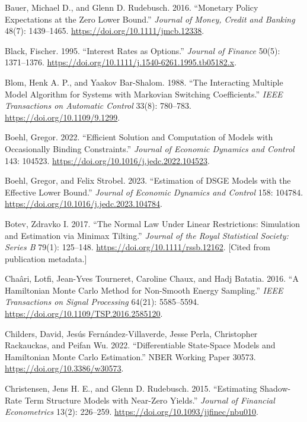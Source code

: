 \documentclass[11pt]{article}
\begin{document}
\begin{list}{}{\setlength{\leftmargin}{2em}\setlength{\itemindent}{-2em}\setlength{\itemsep}{2pt}\setlength{\parsep}{0pt}}
\item Bauer, Michael D., and Glenn D. Rudebusch. 2016. ``Monetary Policy Expectations at the Zero Lower Bound.'' \emph{Journal of Money, Credit and Banking} 48(7): 1439--1465. \url{https://doi.org/10.1111/jmcb.12338}.

\item Black, Fischer. 1995. ``Interest Rates as Options.'' \emph{Journal of Finance} 50(5): 1371--1376. \url{https://doi.org/10.1111/j.1540-6261.1995.tb05182.x}.

\item Blom, Henk A. P., and Yaakov Bar-Shalom. 1988. ``The Interacting Multiple Model Algorithm for Systems with Markovian Switching Coefficients.'' \emph{IEEE Transactions on Automatic Control} 33(8): 780--783. \url{https://doi.org/10.1109/9.1299}.

\item Boehl, Gregor. 2022. ``Efficient Solution and Computation of Models with Occasionally Binding Constraints.'' \emph{Journal of Economic Dynamics and Control} 143: 104523. \url{https://doi.org/10.1016/j.jedc.2022.104523}.

\item Boehl, Gregor, and Felix Strobel. 2023. ``Estimation of DSGE Models with the Effective Lower Bound.'' \emph{Journal of Economic Dynamics and Control} 158: 104784. \url{https://doi.org/10.1016/j.jedc.2023.104784}.

\item Botev, Zdravko I. 2017. ``The Normal Law Under Linear Restrictions: Simulation and Estimation via Minimax Tilting.'' \emph{Journal of the Royal Statistical Society: Series B} 79(1): 125--148. \url{https://doi.org/10.1111/rssb.12162}. [Cited from publication metadata.]

\item Cha\^ari, Lotfi, Jean-Yves Tourneret, Caroline Chaux, and Hadj Batatia. 2016. ``A Hamiltonian Monte Carlo Method for Non-Smooth Energy Sampling.'' \emph{IEEE Transactions on Signal Processing} 64(21): 5585--5594. \url{https://doi.org/10.1109/TSP.2016.2585120}.

\item Childers, David, Jes\'us Fern\'andez-Villaverde, Jesse Perla, Christopher Rackauckas, and Peifan Wu. 2022. ``Differentiable State-Space Models and Hamiltonian Monte Carlo Estimation.'' NBER Working Paper 30573. \url{https://doi.org/10.3386/w30573}.

\item Christensen, Jens H. E., and Glenn D. Rudebusch. 2015. ``Estimating Shadow-Rate Term Structure Models with Near-Zero Yields.'' \emph{Journal of Financial Econometrics} 13(2): 226--259. \url{https://doi.org/10.1093/jjfinec/nbu010}.


\end{list}
\end{document}
